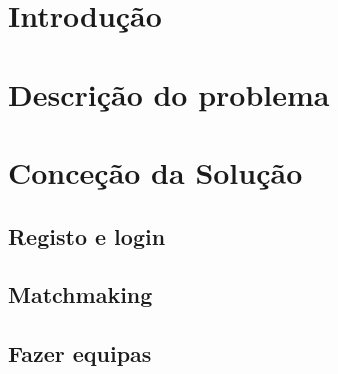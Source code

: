 \documentclass[a4paper]{article}
\begin{document}
\begin{abstract}

\hspace{3mm} 

\end{abstract}

\pagebreak
\tableofcontents

\pagebreak
\section{Introdução}
\label{sec:1}

\hspace{3mm} 




\pagebreak
\section{Descrição do problema}
\label{sec:2}

\hspace{3mm}


\pagebreak
\clearpage

\section{Conceção da Solução}
\label{sec:3}

\subsection{Registo e login}

\hspace{3mm} 



\subsection{Matchmaking}

\hspace{3mm} 


\subsection{Fazer equipas}

\hspace{3mm} 
\end{document}
